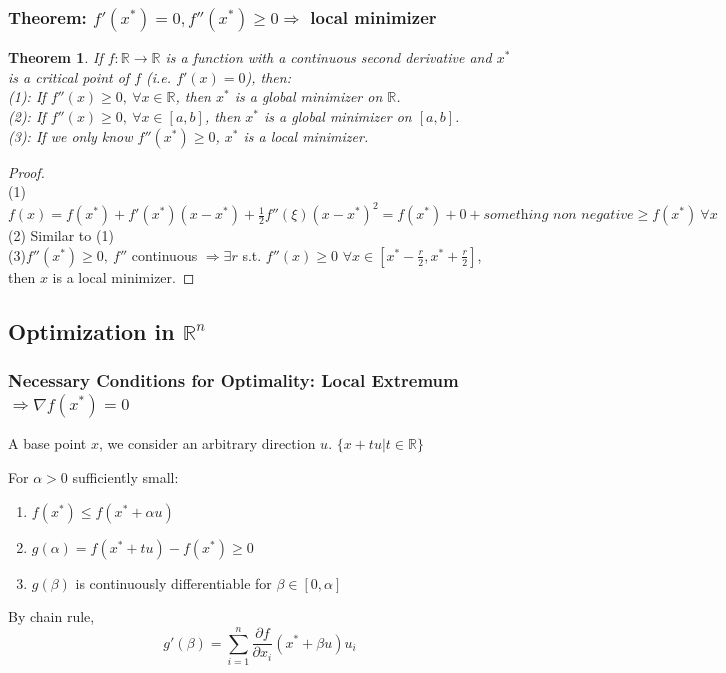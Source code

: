 \documentclass[11pt,a4paper]{article}
\newtheorem{theorem}{Theorem}
\begin{document}
\subsubsection{Theorem: $f'(x^*)=0, f''(x^*)\geq 0 \Rightarrow$ local minimizer}
\begin{theorem}
    If $f:\mathbb{R} \rightarrow \mathbb{R}$ is a function with a continuous second derivative and $x^*$ is a critical point of $f$ (i.e. $f'(x)=0$), then:\\
    (1): If $f''(x)\geq 0,\ \forall x\in\mathbb{R}$, then $x^*$ is a global minimizer on $\mathbb{R}$.\\
    (2): If $f''(x)\geq 0,\ \forall x\in[a,b]$, then $x^*$ is a global minimizer on $[a,b]$.\\
    (3): If we only know $f''(x^*)\geq 0$, $x^*$ is a local minimizer.
\end{theorem}
\begin{proof}
\quad\\
(1)$f(x)=f(x^*)+f'(x^*)(x-x^*)+\frac{1}{2}f''(\xi)(x-x^*)^2=f(x^*)+0+\textit{something non negative}\geq f(x^*)\  \forall x$\\
(2) Similar to (1)\\
(3)$f''(x^*)\geq 0,\ f''$ continuous $\Rightarrow \exists r$ s.t. $f''(x)\geq 0$ $\forall x\in[x^*-\frac{r}{2},x^*+\frac{r}{2}]$, then $x$ is a local minimizer.
\end{proof}


\subsection{Optimization in $\mathbb{R}^n$}
\subsubsection{Necessary Conditions for Optimality: Local Extremum $\Rightarrow \nabla f(x^*)=0$}
A base point $x$, we consider an arbitrary direction $u$. $\{x+tu| t\in \mathbb{R}\}$

For $\alpha>0$ sufficiently small:
\begin{enumerate}
    \item $f(x^*)\leq f(x^*+\alpha u)$
    \item $g(\alpha)=f(x^*+tu)-f(x^*)\geq 0$
    \item $g(\beta)$ is continuously differentiable for $\beta\in[0,\alpha]$
\end{enumerate}

By chain rule, $$g'(\beta)=\sum_{i=1}^n \frac{\partial f}{\partial x_i}(x^*+\beta u)u_i$$
\end{document}
